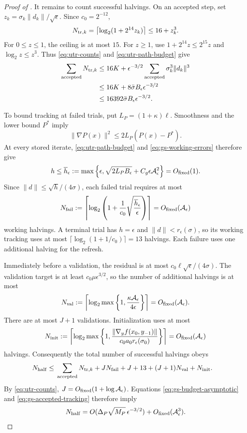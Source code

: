 \documentclass{article}
\begin{document}
\begin{proof}[Proof of ]
It remains to count successful halvings.  On an accepted step, set
$z_k=\sigma_k\|d_k\|/\sqrt\epsilon$.  Since $c_0=2^{-12}$,
\[
 N_{{\rm tr},k}
 =\left\lceil\log_2(1+2^{14}z_k)\right\rceil
 \le16+z_k^3.
\]
For $0\le z\le1$, the ceiling is at most $15$.  For $z\ge1$, use
$1+2^{14}z\le2^{15}z$ and $\log_2z\le z^3$.
Thus \eqref{eq:utr-counts} and \eqref{eq:utr-path-budget} give
\begin{align}
 \sum_{\rm accepted}N_{{\rm tr},k}
 &\le16K+\epsilon^{-3/2}
                  \sum_{\rm accepted}\sigma_k^3\|d_k\|^3\notag\\
 &\le16K+8\bar\sigma B_\epsilon\epsilon^{-3/2}\notag\\
 &\le16392\bar\sigma B_\epsilon\epsilon^{-3/2}.
 \label{eq:gs-accepted-tracking}
\end{align}

To bound tracking at failed trials, put $L_P=(1+\kappa)\ell$.
Smoothness and the lower bound $P^*$ imply
\[
 \|\nabla P(x)\|^2\le2L_P(P(x)-P^*).
\]
At every stored iterate, \eqref{eq:utr-path-budget} and
\eqref{eq:gs-working-errors} therefore give
\[
 h\le\overline h_\epsilon:=
 \max\left\{\epsilon,\sqrt{2L_PB_\epsilon}
                   +C_g\epsilon\mathcal A_\epsilon^2\right\}
 =O_{\rm fixed}(1).
\]
Since $\|d\|\le\sqrt h/(4\sigma)$, each failed trial requires at most
\[
 N_{\rm fail}:=
 \left\lceil\log_2\left(
  1+\frac1{c_0}\sqrt{\frac{\overline h_\epsilon}{\epsilon}}
 \right)\right\rceil
 =O_{\rm fixed}(\mathcal A_\epsilon)
\]
working halvings.  A terminal trial has $h=\epsilon$ and
$\|d\|<r_\epsilon(\sigma)$, so its working tracking uses at most
$\lceil\log_2(1+1/c_0)\rceil=13$ halvings.
Each failure uses one additional halving for the refresh.

Immediately before a validation, the residual is at most
$c_0\ell\sqrt\epsilon/(4\sigma)$.  The validation target is at least
$c_0\mu\epsilon^{3/2}$, so the number of additional halvings is at
most
\[
 N_{\rm val}:=
 \left\lceil\log_2\max\left\{1,
  \frac{\kappa\mathcal A_\epsilon}{4\epsilon}\right\}\right\rceil
 =O_{\rm fixed}(\mathcal A_\epsilon).
\]
There are at most $J+1$ validations.  Initialization uses at most
\[
 N_{\rm init}:=
 \left\lceil\log_2\max\left\{1,
  \frac{\|\nabla_yf(x_0,y_{-1})\|}
       {c_0a_0r_\epsilon(\sigma_0)}\right\}\right\rceil
 =O_{\rm fixed}(\mathcal A_\epsilon)
\]
halvings.  Consequently the total number of successful halvings obeys
\begin{align}
 N_{\rm half}\le{}&
 \sum_{\rm accepted}N_{{\rm tr},k}
 +J N_{\rm fail}+J+13
 +(J+1)N_{\rm val}+N_{\rm init}.
 \label{eq:gs-total-halvings}
\end{align}
By \eqref{eq:utr-counts},
$J=O_{\rm fixed}(1+\log\mathcal A_\epsilon)$.
Equations \eqref{eq:gs-budget-asymptotic} and
\eqref{eq:gs-accepted-tracking} therefore imply
\[
 N_{\rm half}
 =O(\Delta_P\sqrt{M_P}\,\epsilon^{-3/2})
  +O_{\rm fixed}(\mathcal A_\epsilon^3).
\]


\end{proof}
\end{document}
